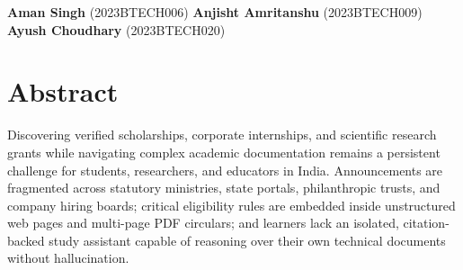 \documentclass[12pt,a4paper,oneside]{report}
\begin{document}
\vspace{1.2cm}
\noindent
\textbf{Aman Singh} (2023BTECH006) \hfill \textbf{Anjisht Amritanshu} (2023BTECH009) \hfill \textbf{Ayush Choudhary} (2023BTECH020)

\chapter*{Abstract}
\thispagestyle{plain}
Discovering verified scholarships, corporate internships, and scientific research grants while navigating complex academic documentation remains a persistent challenge for students, researchers, and educators in India. Announcements are fragmented across statutory ministries, state portals, philanthropic trusts, and company hiring boards; critical eligibility rules are embedded inside unstructured web pages and multi-page PDF circulars; and learners lack an isolated, citation-backed study assistant capable of reasoning over their own technical documents without hallucination.
\end{document}
